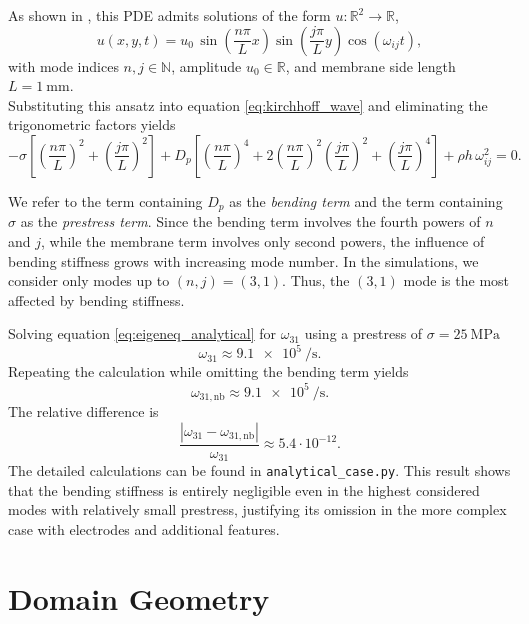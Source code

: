 As shown in \cite{schmid2016fundamentals}, this PDE admits solutions of the form $u:\mathbb{R}^2\to\mathbb{R}$,
\begin{equation*}
    u(x,y,t) = u_0 \, \sin\!\left(\frac{n\pi}{L}x\right) \sin\!\left(\frac{j\pi}{L}y\right) 
    \cos(\omega_{ij} t),
\end{equation*}
with mode indices $n,j \in \mathbb{N}$, amplitude $u_0 \in \mathbb{R}$, and membrane side length $L = \SI{1}{\milli\meter}$.\\

Substituting this ansatz into equation \eqref{eq:kirchhoff_wave} and eliminating the trigonometric factors yields
\begin{equation}
    -\sigma \left[ \left(\frac{n\pi}{L}\right)^2 + \left(\frac{j\pi}{L}\right)^2 \right]
    + D_p \left[ \left(\frac{n\pi}{L}\right)^4 + 2 \left(\frac{n\pi}{L}\right)^2 \left(\frac{j\pi}{L}\right)^2 + \left(\frac{j\pi}{L}\right)^4 \right]
    + \rho h \, \omega_{ij}^2 = 0.
    \label{eq:eigeneq_analytical}
\end{equation}

We refer to the term containing $D_p$ as the \emph{bending term} and the term containing $\sigma$ as the \emph{prestress term}. Since the bending term involves the fourth powers of $n$ and $j$, while the membrane term involves only second powers, the influence of bending stiffness grows with increasing mode number. In the simulations, we consider only modes up to $(n,j) = (3,1)$. Thus, the $(3,1)$ mode is the most affected by bending stiffness.

Solving equation \eqref{eq:eigeneq_analytical} for $\omega_{31}$ using a prestress of $\sigma=\SI{25}{\mega\pascal}$ 
\[
\omega_{31} \approx \SI{9.1e5}{\per\second}.
\] 
Repeating the calculation while omitting the bending term yields 
\[
\omega_{31,\mathrm{nb}} \approx \SI{9.1e5}{\per\second}.
\] 
The relative difference is
\[
\frac{|\omega_{31} - \omega_{31,\mathrm{nb}}|}{\omega_{31}} \approx 5.4 \cdot 10^{-12}.
\]
The detailed calculations can be found in \texttt{analytical\_case.py}. This result shows that the bending stiffness is entirely negligible even in the highest considered modes with relatively small prestress, justifying its omission in the more complex case with electrodes and additional features.\\




\section{Domain Geometry}

